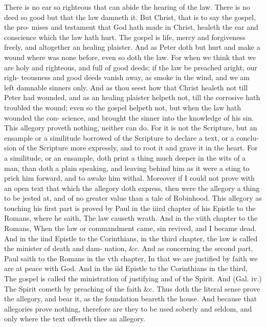 \documentclass{custom}
\begin{document}
There is no ear so righteous that can abide the hearing 
of the law. There is no deed so good but that the law 
damneth it. But Christ, that is to say the gospel, the pro- 
mises and testament that God hath made in Christ, healeth 
the ear and conscience which the law hath hurt. The 
gospel is life, mercy and forgiveness freely, and altogether 
an healing plaister. And as Peter doth but hurt and 
make a wound where was none before, even so doth the 
law. For when we think that we are holy and righteous, and 
full of good deeds; if the law be preached aright, our righ- 
teousness and good deeds vanish away, as smoke in the 
wind, and we am left damnable sinners only. And as 
thou seest how that Christ healeth not till Peter had 
wounded, and as an healing plaister helpeth not, till the 
corrosive hath troubled the wound; even so the gospel 
helpeth not, but when the law hath wounded the con- 
science, and brought the sinner into the knowledge of his 
sin. This allegory proveth nothing, neither can do. For 
it is not the Scripture, but an ensample or a similitude 
borrowed of the Scripture to declare a text, or a conclu- 
sion of the Scripture more expressly, and to root it and 
grave it in the heart. For a similitude, or an ensample, 
doth print a thing much deeper in the wits of a man, than 
doth a plain speaking, and leaving behind him as it were a 
sting to prick him forward, and to awake him withal. 
Moreover if I could not prove with an open text that 
which the allegory doth express, then were the allegory a 
thing to be jested at, and of no greater value than a tale 
of Robinhood. This allegory as touching his first part is 
proved by Paul in the iiird chapter of his Epistle to the 
Romans, where he saith, The law causeth wrath. And 
in the viith chapter to the Romans, When the law or 
commandment came, sin revived, and I became dead. 
And in the iind Epistle to the Corinthians, in the third 
chapter, the law is called the minister of death and dam- 
nation, &c. And as concerning the second part, Paul 
saith to the Romans in the vth chapter, In that we are 
justified by faith we are at peace with God. And in the 
iid Epistle to the Corinthians in the third, The gospel is 
called the ministration of justifying and of the Spirit. 
And (Gal. iv.) The Spirit cometh by preaching of the faith 
&c. Thus doth the literal sense prove the allegory, and 
bear it, as the foundation beareth the house. And because 
that allegories prove nothing, therefore are they to be used 
soberly and seldom, and only where the text offereth thee 
an allegory. 
\end{document}
